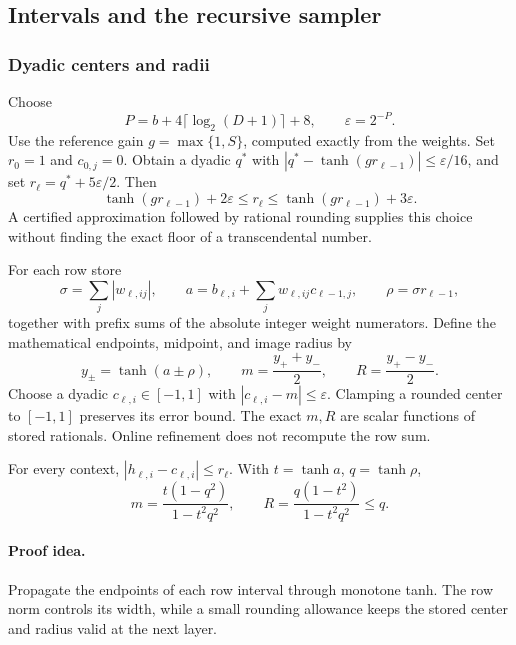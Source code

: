 \subsection{Intervals and the recursive sampler}\label{sec:algorithm}
\subsubsection{Dyadic centers and radii}

Choose
\begin{equation}\label{eq:precision}
P=b+4\lceil\log_2(D+1)\rceil+8,\qquad
\varepsilon=2^{-P}.
\end{equation}
Use the reference gain \(g=\max\{1,S\}\), computed exactly from the weights.
Set \(r_0=1\) and \(c_{0,j}=0\). Obtain a dyadic \(q^\ast\) with
\(|q^\ast-\tanh(gr_{\ell-1})|\le\varepsilon/16\), and set
\(r_\ell=q^\ast+5\varepsilon/2\). Then
\begin{equation}\label{eq:rounded}
\tanh(gr_{\ell-1})+2\varepsilon
\le r_\ell\le\tanh(gr_{\ell-1})+3\varepsilon.
\end{equation}
A certified approximation followed by rational rounding supplies
this choice without finding the exact floor of a transcendental
number.

For each row store
\begin{equation}\label{eq:rowdata}
\sigma=\sum_j|w_{\ell,ij}|,\qquad
a=b_{\ell,i}+\sum_jw_{\ell,ij}c_{\ell-1,j},\qquad
\rho=\sigma r_{\ell-1},
\end{equation}
together with prefix sums of the absolute integer weight numerators.
Define the mathematical endpoints, midpoint, and image radius by
\[
y_\pm=\tanh(a\pm\rho),\qquad
m=\frac{y_++y_-}{2},\qquad R=\frac{y_+-y_-}{2}.
\]
Choose a dyadic \(c_{\ell,i}\in[-1,1]\) with
\(|c_{\ell,i}-m|\le\varepsilon\). Clamping a rounded center to
\([-1,1]\) preserves its error bound.
The exact \(m,R\) are scalar functions of stored rationals.
Online refinement does not recompute the row sum.

\begin{lemma}\label{lem:interval}
For every context, \(|h_{\ell,i}-c_{\ell,i}|\le r_\ell\).
With \(t=\tanh a\), \(q=\tanh\rho\),
\begin{equation}\label{eq:midrad}
m=\frac{t(1-q^2)}{1-t^2q^2},\qquad
R=\frac{q(1-t^2)}{1-t^2q^2}\le q.
\end{equation}
\end{lemma}
\paragraph{Proof idea.}
Propagate the endpoints of each row interval through monotone tanh. The row
norm controls its width, while a small rounding allowance keeps the stored
center and radius valid at the next layer.

